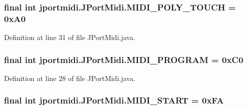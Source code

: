 \subsubsection[{\texorpdfstring{M\+I\+D\+I\+\_\+\+P\+O\+L\+Y\+\_\+\+T\+O\+U\+CH}{MIDI_POLY_TOUCH}}]{\setlength{\rightskip}{0pt plus 5cm}final {\bf int} jportmidi.\+J\+Port\+Midi.\+M\+I\+D\+I\+\_\+\+P\+O\+L\+Y\+\_\+\+T\+O\+U\+CH = 0x\+A0}\hypertarget{classjportmidi_1_1_j_port_midi_a66b8a5b39d1e8201501dcf9df09c52f4}{}\label{classjportmidi_1_1_j_port_midi_a66b8a5b39d1e8201501dcf9df09c52f4}


Definition at line 31 of file J\+Port\+Midi.\+java.

\subsubsection[{\texorpdfstring{M\+I\+D\+I\+\_\+\+P\+R\+O\+G\+R\+AM}{MIDI_PROGRAM}}]{\setlength{\rightskip}{0pt plus 5cm}final {\bf int} jportmidi.\+J\+Port\+Midi.\+M\+I\+D\+I\+\_\+\+P\+R\+O\+G\+R\+AM = 0x\+C0}\hypertarget{classjportmidi_1_1_j_port_midi_a8a51b8c034a4219a6a2d61ba74fc2fc2}{}\label{classjportmidi_1_1_j_port_midi_a8a51b8c034a4219a6a2d61ba74fc2fc2}


Definition at line 28 of file J\+Port\+Midi.\+java.

\subsubsection[{\texorpdfstring{M\+I\+D\+I\+\_\+\+S\+T\+A\+RT}{MIDI_START}}]{\setlength{\rightskip}{0pt plus 5cm}final {\bf int} jportmidi.\+J\+Port\+Midi.\+M\+I\+D\+I\+\_\+\+S\+T\+A\+RT = 0x\+FA}\hypertarget{classjportmidi_1_1_j_port_midi_a66050950cd1e7cc5db7aef10f261d908}{}\label{classjportmidi_1_1_j_port_midi_a66050950cd1e7cc5db7aef10f261d908}


